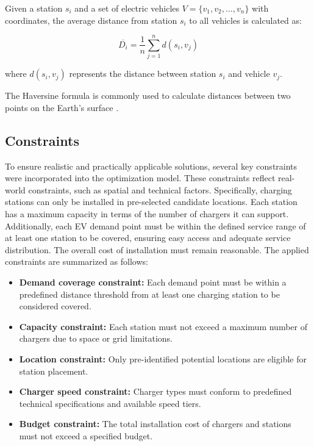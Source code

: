 Given a station \( s_i \) and a set of electric vehicles \( V = \{v_1, v_2, \ldots, v_n\} \) with coordinates, the average distance from station \( s_i \) to all vehicles is calculated as:

\[
\overline{D_i} = \frac{1}{n} \sum_{j=1}^n d(s_i, v_j)
\]

where \( d(s_i, v_j) \) represents the distance between station \( s_i \) and vehicle \( v_j \).

The Haversine formula is commonly used to calculate distances between two points on the Earth's surface \cite{Virtues of the Haversine}.

\subsection{Constraints}

To ensure realistic and practically applicable solutions, several key constraints were incorporated into the optimization model. These constraints reflect real-world constraints, such as spatial and technical factors. Specifically, charging stations can only be installed in pre-selected candidate locations. Each station has a maximum capacity in terms of the number of chargers it can support. Additionally, each EV demand point must be within the defined service range of at least one station to be covered, ensuring easy access and adequate service distribution. The overall cost of installation must remain reasonable. The applied constraints are summarized as follows:

\begin{itemize}
    \item \textbf{Demand coverage constraint:} Each demand point must be within a predefined distance threshold from at least one charging station to be considered covered.
    \item \textbf{Capacity constraint:} Each station must not exceed a maximum number of chargers due to space or grid limitations.
    \item \textbf{Location constraint:} Only pre-identified potential locations are eligible for station placement.
    \item \textbf{Charger speed constraint:} Charger types must conform to predefined technical specifications and available speed tiers.
    \item \textbf{Budget constraint:} The total installation cost of chargers and stations must not exceed a specified budget.
\end{itemize}



